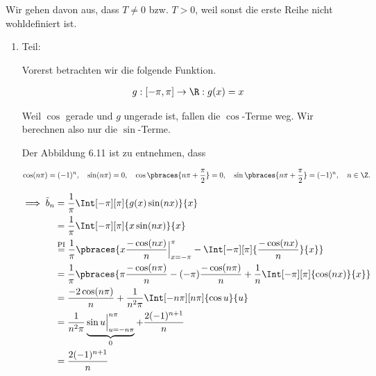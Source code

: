 \begin{solution}

Wir gehen davon aus, dass $T \neq 0$ bzw. $T > 0$, weil sonst die erste Reihe nicht wohldefiniert ist.


\begin{enumerate}[label = \arabic*.]

    \item Teil:

    Vorerst betrachten wir die folgende Funktion.

    \begin{align*}
        g:
        [-\pi, \pi] \to \R:
        g(x) = x
    \end{align*}

    Weil $\cos$ gerade und $g$ ungerade ist, fallen die $\cos$-Terme weg.
    Wir berechnen also nur die $\sin$-Terme.


    Der Abbildung 6.11 ist zu entnehmen, dass

    \begin{align*}
        \cos(n \pi) = (-1)^n,
        \quad
        \sin(n \pi) = 0,
        \quad
        \cos \pbraces{n \pi + \frac{\pi}{2}} = 0,
        \quad
        \sin \pbraces{n \pi + \frac{\pi}{2}} = (-1)^n,
        \quad
        n \in \Z.
    \end{align*}

    \begin{align*}
        \implies
        \tilde b_n
        & =
        \frac{1}{\pi}
        \Int[-\pi][\pi]{g(x) \sin (n x)}{x} \\
        & =
        \frac{1}{\pi}
        \Int[-\pi][\pi]{x \sin (n x)}{x} \\
        & \stackrel
        {
            \mathrm{PI}
        }{=}
        \frac{1}{\pi}
        \pbraces
        {
            x \frac{-\cos(n x)}{n} \Big |_{x=-\pi}^\pi
            -
            \Int[-\pi][\pi]
            {
                \frac{-\cos(n x)}{n}
            }{x}
        } \\
        & =
        \frac{1}{\pi}
        \pbraces
        {
            \pi \frac{-\cos(n \pi)}{n}
            -
            (-\pi) \frac{-\cos(n \pi)}{n}
            +
            \frac{1}{n}
            \Int[-\pi][\pi]
            {
                \cos(n x)
            }{x}
        } \\
        & =
        \frac{-2 \cos(n \pi)}{n}
        +
        \frac{1}{n^2 \pi}
        \Int[-n \pi][n \pi]{\cos u}{u} \\
        & =
        \frac{1}{n^2 \pi}
        \underbrace
        {
            \sin u \Big |_{u = -n \pi}^{n \pi}
        }_0
        +
        \frac{2 (-1)^{n+1}}{n} \\
        & =
        \frac{2 (-1)^{n+1}}{n}
    \end{align*}


\end{enumerate}
\end{solution}
